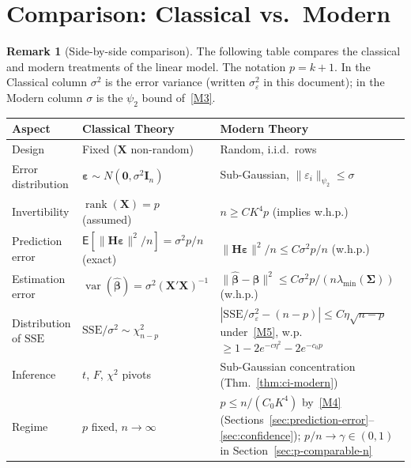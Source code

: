 \documentclass[12pt,a4paper]{article}
\theoremstyle{definition}
\newtheorem{remark}[theorem]{Remark}
\newcommand\expc{\mathsf{E}}
\DeclareMathOperator\var{var}
\DeclareMathOperator\rank{rank}
\newcommand{\SSE}{\mathrm{SSE}}
\newcommand{\bX}{\mathbf{X}}
\def\bb{\boldsymbol{\beta}}
\newcommand{\be}{\boldsymbol{\varepsilon}}
\newcommand{\bI}{\mathbf{I}}
\newcommand{\bH}{\mathbf{H}}
\newcommand{\bzero}{\mathbf{0}}
\newcommand{\bSigma}{\boldsymbol{\Sigma}}
\newcommand{\hbb}{\hat{\boldsymbol{\beta}}}
\begin{document}
\section{Comparison: Classical vs.\ Modern}\label{sec:comparison}

\begin{remark}[Side-by-side comparison]
The following table compares the classical and modern treatments of the linear model. The notation $p = k+1$. In the Classical column $\sigma^2$ is the error variance (written $\sigma_\varepsilon^2$ in this document); in the Modern column $\sigma$ is the $\psi_2$ bound of~\ref{M3}.
\end{remark}

\medskip
\begin{center}
\renewcommand{\arraystretch}{1.4}
\begin{tabular}{@{}>{\raggedright\arraybackslash}p{3.2cm}>{\raggedright\arraybackslash}p{5.5cm}>{\raggedright\arraybackslash}p{5.5cm}@{}}
\toprule
\textbf{Aspect} & \textbf{Classical Theory} & \textbf{Modern Theory} \\
\midrule
Design & Fixed ($\bX$ non-random) & Random, i.i.d.\ rows \\
Error distribution & $\be \sim N(\bzero, \sigma^2\bI_n)$ & Sub-Gaussian, $\|\varepsilon_i\|_{\psi_2} \leqslant \sigma$ \\
Invertibility & $\rank(\bX) = p$ (assumed) & $n \geqslant CK^4 p$ (implies w.h.p.) \\
Prediction error & $\expc[\|\bH\be\|^2/n] = \sigma^2 p/n$ (exact) & $\|\bH\be\|^2/n \leqslant C\sigma^2 p/n$ (w.h.p.) \\
Estimation error & $\var(\hat{\bb}) = \sigma^2(\bX'\bX)^{-1}$ & $\|\hbb - \bb\|^2 \leqslant C\sigma^2 p/(n\lambda_{\min}(\bSigma))$ (w.h.p.) \\
Distribution of $\SSE$ & $\SSE/\sigma^2 \sim \chi^2_{n-p}$ & $|\SSE/\sigma_\varepsilon^2 - (n-p)| \leqslant C\eta\sqrt{n-p}$ under~\ref{M5}, w.p.\ $\geqslant 1 - 2e^{-c\eta^2} - 2e^{-c_0p}$ \\
Inference & $t$, $F$, $\chi^2$ pivots & Sub-Gaussian concentration (Thm.~\ref{thm:ci-modern}) \\
Regime & $p$ fixed, $n \to \infty$ & $p \leqslant n/(C_0K^4)$ by~\ref{M4} (Sections~\ref{sec:prediction-error}--\ref{sec:confidence}); $p/n \to \gamma \in (0,1)$ in Section~\ref{sec:p-comparable-n} \\
\bottomrule
\end{tabular}
\end{center}
\end{document}
